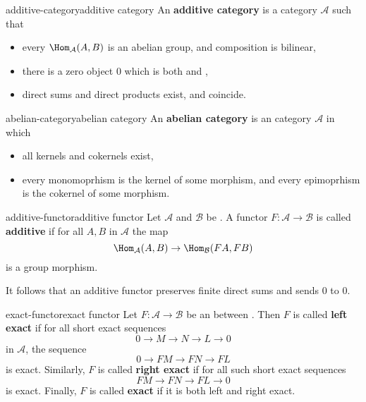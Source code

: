 \begin{topic}{additive-category}{additive category}
    An \textbf{additive category} is a category $\mathcal{A}$ such that
    \begin{itemize}
        \item every $\Hom_\mathcal{A}(A, B)$ is an abelian group, and composition is bilinear,
        \item there is a zero object $0$ which is both  and ,
        \item direct sums and direct products exist, and coincide.
    \end{itemize}
\end{topic}

\begin{topic}{abelian-category}{abelian category}
    An \textbf{abelian category} is an  category $\mathcal{A}$ in which
    \begin{itemize}
        \item all kernels and cokernels exist,
        \item every monomoprhism is the kernel of some morphism, and every epimoprhism is the cokernel of some morphism.
    \end{itemize}
\end{topic}

\begin{topic}{additive-functor}{additive functor}
    Let $\mathcal{A}$ and $\mathcal{B}$ be . A functor $F : \mathcal{A} \to \mathcal{B}$ is called \textbf{additive} if for all $A, B$ in $\mathcal{A}$ the map
    \[ \Hom_\mathcal{A}(A, B) \to \Hom_\mathcal{B}(FA, FB) \]
    is a group morphism.
    
    It follows that an additive functor preserves finite direct sums and sends $0$ to $0$.
\end{topic}

\begin{topic}{exact-functor}{exact functor}
    Let $F : \mathcal{A} \to \mathcal{B}$ be an  between . Then $F$ is called \textbf{left exact} if for all short exact sequences
    \[ 0 \to M \to N \to L \to 0 \]
     in $\mathcal{A}$, the sequence
    \[ 0 \to FM \to FN \to FL \]
    is exact. Similarly, $F$ is called \textbf{right exact} if for all such short exact sequences
    \[ FM \to FN \to FL \to 0 \]
    is exact. Finally, $F$ is called \textbf{exact} if it is both left and right exact.
\end{topic}

